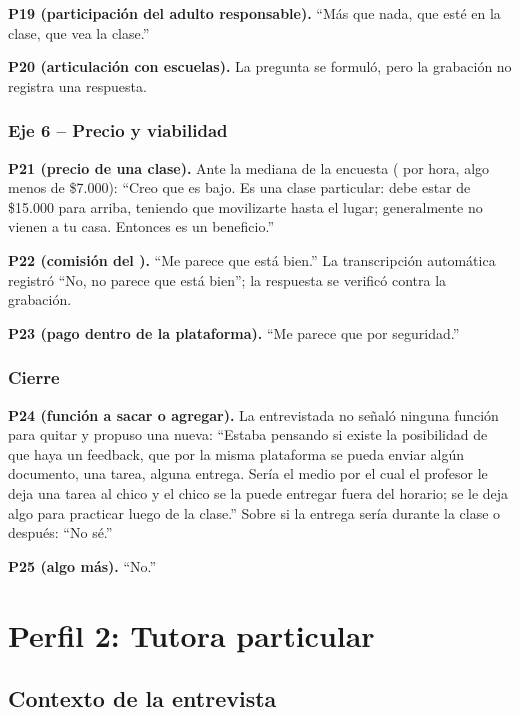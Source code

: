 \textbf{P19 (participación del adulto responsable).} ``Más que nada, que
esté en la clase, que vea la clase.''

\textbf{P20 (articulación con escuelas).} La pregunta se formuló, pero la
grabación no registra una respuesta.

\subsubsection*{Eje 6 -- Precio y viabilidad}

\textbf{P21 (precio de una clase).} Ante la mediana de la encuesta
( por hora, algo menos de \$7.000): ``Creo que es bajo. Es una
clase particular: debe estar de \$15.000 para arriba, teniendo que
movilizarte hasta el lugar; generalmente no vienen a tu casa. Entonces es
un beneficio.''

\textbf{P22 (comisión del \comision{}).} ``Me parece que está bien.''
La transcripción automática registró ``No, no parece que está bien''; la
respuesta se verificó contra la grabación.

\textbf{P23 (pago dentro de la plataforma).} ``Me parece que por
seguridad.''

\subsubsection*{Cierre}

\textbf{P24 (función a sacar o agregar).} La entrevistada no señaló
ninguna función para quitar y propuso una nueva: ``Estaba pensando si
existe la posibilidad de que haya un feedback, que por la misma
plataforma se pueda enviar algún documento, una tarea, alguna entrega.
Sería el medio por el cual el profesor le deja una tarea al chico y el
chico se la puede entregar fuera del horario; se le deja algo para
practicar luego de la clase.'' Sobre si la entrega sería durante la clase
o después: ``No sé.''

\textbf{P25 (algo más).} ``No.''

\section{Perfil 2: Tutora particular}

\subsection{Contexto de la entrevista}

